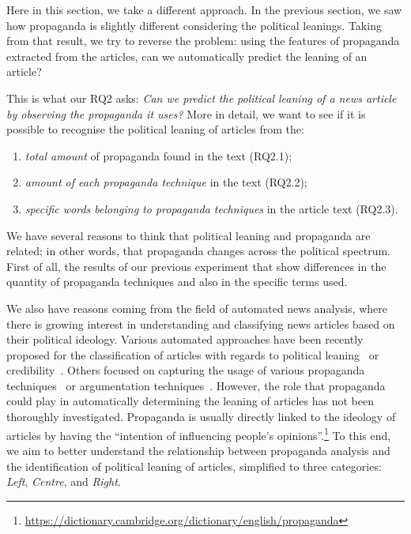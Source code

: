 Here in this section, we take a different approach.
In the previous section, we saw how propaganda is slightly different considering the political leanings.
Taking from that result, we try to reverse the problem: using the features of propaganda extracted from the articles, can we automatically predict the leaning of an article?

This is what our RQ2 asks: \emph{Can we predict the political leaning of a news article by observing the propaganda it uses?}
More in detail, we want to see if it is possible to recognise the political leaning of articles from the:
\begin{enumerate}
    \item \emph{total amount} of propaganda found in the text (RQ2.1);
    \item \emph{amount of each propaganda technique} in the text (RQ2.2);
    \item \emph{specific words belonging to propaganda techniques} in the article text (RQ2.3).
\end{enumerate}


We have several reasons to think that political leaning and propaganda are related; in other words, that propaganda changes across the political spectrum.
First of all, the results of our previous experiment that show differences in the quantity of propaganda techniques and also in the specific terms used.

We also have reasons coming from the field of automated news analysis, where there is growing interest in understanding and classifying news articles based on their political ideology.
Various automated approaches have been recently proposed for the classification of articles with regards to political leaning~\cite{baly2020we} or credibility~\cite{horne2018assessing}. Others focused on capturing the usage of various propaganda techniques~\cite{da2019fine} or argumentation techniques~\cite{lippi2016argumentation}. However, the role that propaganda could play in automatically determining the leaning of articles has not been thoroughly investigated.
Propaganda is usually directly linked to the ideology of articles by having the ``intention of influencing people's opinions''.\footnote{\url{https://dictionary.cambridge.org/dictionary/english/propaganda}} To this end, we aim to better understand the relationship between propaganda analysis and the identification of political leaning of articles, simplified to three categories: \textit{Left}, \textit{Centre}, and \textit{Right}.

